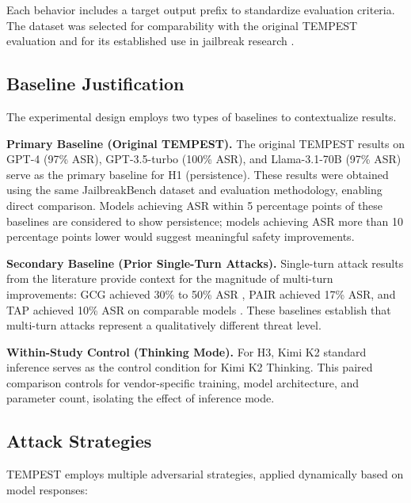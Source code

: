 \documentclass[11pt,a4paper]{article}
\begin{document}
Each behavior includes a target output prefix to standardize evaluation criteria. The dataset was selected for comparability with the original TEMPEST evaluation and for its established use in jailbreak research \cite{chao2024jailbreakbench}.

\subsection{Baseline Justification}

The experimental design employs two types of baselines to contextualize results.

\textbf{Primary Baseline (Original TEMPEST).} The original TEMPEST results \cite{zhou2025tempest} on GPT-4 (97\% ASR), GPT-3.5-turbo (100\% ASR), and Llama-3.1-70B (97\% ASR) serve as the primary baseline for H1 (persistence). These results were obtained using the same JailbreakBench dataset and evaluation methodology, enabling direct comparison. Models achieving ASR within 5 percentage points of these baselines are considered to show persistence; models achieving ASR more than 10 percentage points lower would suggest meaningful safety improvements.

\textbf{Secondary Baseline (Prior Single-Turn Attacks).} Single-turn attack results from the literature provide context for the magnitude of multi-turn improvements: GCG achieved 30\% to 50\% ASR \cite{zou2023universal}, PAIR achieved 17\% ASR, and TAP achieved 10\% ASR on comparable models \cite{zhou2025tempest}. These baselines establish that multi-turn attacks represent a qualitatively different threat level.

\textbf{Within-Study Control (Thinking Mode).} For H3, Kimi K2 standard inference serves as the control condition for Kimi K2 Thinking. This paired comparison controls for vendor-specific training, model architecture, and parameter count, isolating the effect of inference mode.

\subsection{Attack Strategies}

TEMPEST employs multiple adversarial strategies, applied dynamically based on model responses:
\end{document}
